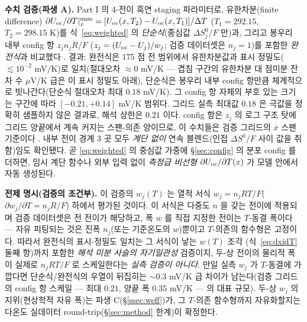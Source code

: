 \begin{srcbox}
\textbf{수치 검증(파생 A).} Part I 의 4-전이 흑연 staging 파라미터로, 유한차분(finite difference)
$\partial U_{\mathrm{oc}}/\partial T|_x^\mathrm{num}=[U_{\mathrm{oc}}(x,T_2)-U_{\mathrm{oc}}(x,T_1)]/\Delta T$ ($T_1{=}292.15$, $T_2{=}298.15$ K)를
식~\eqref{eq:weighted} 의 \emph{단순식}(중심값 $\Delta S^0_j/F$ 만)과, 그리고 봉우리 내부 config 항 $z_j n_jR/F$
($z_j=(U_{\mathrm{oc}}-U_j)/w_j$; 검증 데이터셋은 $n_j{=}1$)를 포함한 \emph{완전식}과 비교했다 \cite{numverif2026}.
결과: 완전식은 175 점 전 범위에서 유한차분값과 표시 정밀도($\lesssim10^{-2}$ mV/K)로 일치(절대오차 $\approx0$
mV/K --- 겹침 구간의 유한차분 대 점미분 잔차 수 $\mu$V/K 급은 이 표시 정밀도 아래), 단순식은 봉우리 내부
config 항만큼 체계적으로 빗나간다(단순식 절대오차 최대 $0.18$ mV/K). 그 config 항 자체의 부호 있는 크기는
구간에 따라 $[-0.21,+0.14]$ mV/K 범위다. 그리드 실측 최대값 $0.18$ 은 극값을 정확히 샘플하지 않은 결과로,
해석 상한은 $0.21$ 이다. config 항은 $z_j$ 의 로그 구조 탓에 그리드 양끝에서 계속 커지는 스팬-의존 양이므로,
이 수치들은 검증 그리드의 $\bar x$ 스팬 기준이다 \cite{numverif2026}. 내부 전이 경계 3 곳 모두 \emph{계단 없이}
연속 블렌드(인접 $\Delta S^0/F$ 사이 값을 취함)임도 확인됐다. 곧 \eqref{eq:weighted} 의 중심값 가중에
\S\ref{sec:config} 의 분포 config 를 더하면, 임시 계단 함수나 외부 입력 없이 \emph{측정급 비선형}
$\partial U_{\mathrm{oc}}/\partial T(x)$ 가 모델 안에서 자동 생성된다.

\textbf{전제 명시(검증의 조건부).} 이 검증의 $w_j(T)$ 는 열적 서식 $w_j=n_jRT/F$($\partial
w_j/\partial T=n_jR/F$) 하에서 평가된 것이다. 이 서식은 다중도 $n$ 을 갖는 전이에 적용되며 검증 데이터셋은 전
전이가 해당하고, 폭 $w$ 를 직접 지정한 전이는 $T$-동결 폭이다 --- 자유 피팅되는 것은 진폭 $n_j$(또는 기준온도의
$w$)뿐이고 $T$-의존의 함수형은 고정이다. 따라서 완전식의 표시-정밀도 일치는 그 서식이 낳는 $w(T)$ 조각
(식~\eqref{eq:dxidT} 둘째 항)까지 포함한 \emph{해석 미분 사슬의 자기일관성} 검증이지, 두-상 전이의 물리적 폭이
실제로 $n_jRT/F$ 로 스케일한다는 \emph{실측 검증이 아니다}. 만일 실측 $w_j$ 가 $T$-동결에 가깝다면 단순식/완전식의
우열이 뒤집히는 $\sim$0.3 mV/K 급 차이가 남는다(검증 그리드의 config 항 스케일 --- 최대 $0.21$, 양끝 폭 $0.35$
mV/K --- 의 대표 규모). 두-상 $w_j$ 의 지위(현상학적 자유 폭)는 파생 C(\S\ref{ssec:weff})가, 그 $T$-의존
함수형까지 자유화할지는 다온도 실데이터 round-trip(\S\ref{sec:method} 한계)이 확정한다.
\end{srcbox}

